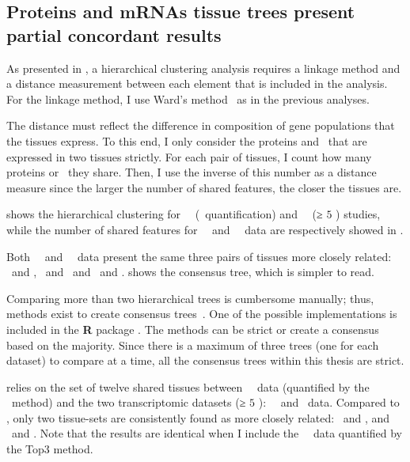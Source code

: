 \subsection{Proteins and mRNAs tissue trees present partial concordant results\\}
\vspace{-12mm}

As presented in ,
a hierarchical clustering analysis requires a linkage method
and a distance measurement between each element that is included in the analysis.
For the linkage method, I use Ward's method~
as in the previous analyses.

The distance must reflect the difference in composition of gene populations
that the tissues express.
To this end,
I only consider the proteins and \mRNAs\
that are expressed in two tissues strictly.
For each pair of tissues,
I count how many proteins or \mRNAs\ they share.
Then, I use the inverse of this number as a distance measure
since the larger the number of shared features,
the closer the tissues are.

 shows the hierarchical clustering for
\pandey\ \etal\ (\PPKM\ quantification)
and \uhlen\ \etal\ (≥ $5$ \FPKM)  studies,
while the number of shared features for \pandey\ \etal\ and \uhlen\ \etal\ data
are respectively showed in .

Both \pandey\ \etal\ and \uhlen\ \etal\ data present
the same three pairs of tissues more closely related:
\Testis\ and \Ovary, \Rectum\ and \hColon\ and \Liver\ and \Kidney.
\Cref{fig:consensus2D15TQ3} shows the consensus tree,
which is simpler to read.\\
\vspace{-\baselineskip}

Comparing more than two hierarchical trees is cumbersome manually;
thus, methods exist to create consensus trees~.
One of the possible implementations is included in
the \textbf{\textsf{R}} package .
The methods can be strict or create a consensus based on the majority.
Since there is a maximum of three trees (one for each dataset)
to compare at a time,
all the consensus trees within this thesis are strict.

 relies on the set of twelve shared tissues between
\pandey\ \etal\ data (quantified by the \PPKM\ method)
and the two transcriptomic datasets (≥ $5$ \FPKM): \uhlen\ \etal\ and \gtex\ data.
Compared to \Cref{fig:consensus2D15TQ3},
only two tissue-sets are consistently found
as more closely related: \Testis\ and \Ovary, and \Liver\ and \Kidney.
Note that the results are identical
when I include the \pandey\ \etal\ data quantified by the Top3 method.


